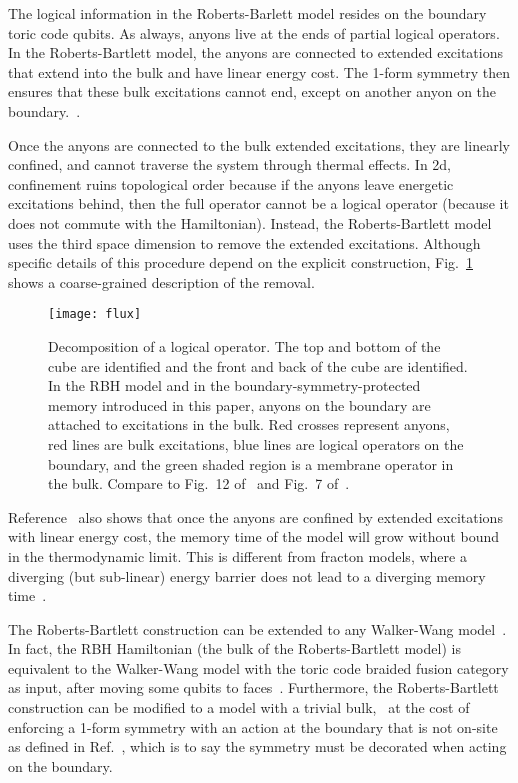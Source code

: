 The logical information in the Roberts-Barlett model resides on the boundary toric code qubits. As always, anyons live at the ends of partial logical operators.  In the Roberts-Bartlett model, the anyons are connected to extended excitations that extend into the bulk and have linear energy cost. The 1-form symmetry then ensures that these bulk excitations cannot end, except on another anyon on the boundary.~\cite{RobertsBartlett2020}.

Once the anyons are connected to the bulk extended excitations, they are linearly confined, and cannot traverse the system through thermal effects. In 2d, confinement ruins topological order because if the anyons leave energetic excitations behind, then the full operator cannot be a logical operator (because it does not commute with the Hamiltonian). Instead, the Roberts-Bartlett model uses the third space dimension to remove the extended excitations. Although specific details of this procedure depend on the explicit construction, Fig.~\ref{fig:flux} shows a coarse-grained description of the removal.

\begin{figure}[th!]
    \centering
    \texttt{[image: flux]}
    \caption[Decomposition of a logical operator]{Decomposition of a logical operator. The top and bottom of the cube are identified and the front and back of the cube are identified. In the RBH model and in the boundary-symmetry-protected memory introduced in this paper, anyons on the boundary are attached to excitations in the bulk. Red crosses represent anyons, red lines are bulk excitations, blue lines are logical operators on the boundary, and the green shaded region is a membrane operator in the bulk. Compare to Fig.~12 of~\cite{RobertsBartlett2020} and Fig.~7 of~\cite{StahlNandkishore2021}.}
    \label{fig:flux}
\end{figure}

Reference~\cite{RobertsBartlett2020} also shows that once the anyons are confined by extended excitations with linear energy cost, the memory time of the model will grow without bound in the thermodynamic limit. This is different from fracton models, where a diverging (but sub-linear) energy barrier does not lead to a diverging memory time~\cite{Siva2017Marginally}.

The Roberts-Bartlett construction can be extended to any Walker-Wang model~\cite{WalkerWang2011, vonKeyserlingk2013SurfaceAnyons}. In fact, the RBH Hamiltonian (the bulk of the Roberts-Bartlett model) is equivalent to the Walker-Wang model with the toric code braided fusion category as input, after moving some qubits to faces~\cite{Roberts20203Fermion}. Furthermore, the Roberts-Bartlett construction can be modified to a model with a trivial bulk,~\cite{StahlNandkishore2021} at the cost of enforcing a 1-form symmetry with an action at the boundary that is not on-site as defined in Ref.~\cite{Wen2019Higher}, which is to say the symmetry must be decorated when acting on the boundary.

